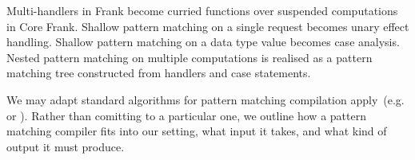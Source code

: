 \documentclass[preprint]{sigplanconf}
\newcommand{\many}{\overline}
\newcommand{\judgeword}[1]{~\mathbf{#1}~}
\newcommand{\sigentails}[1]{\mathbin{[{\text{\scriptsize ${#1}$}}]\!\text{-\!-}}\,}
\newcommand{\rt}[1]{\langle{#1}\rangle}   %
\newcommand{\makes}[4]  {#1 \sigentails{#2} {#3} \judgeword{is} {#4}}
\newcommand{\can}[4]{#1 \sigentails{#2} {#3} \judgeword{is} {#4}}
\newcommand{\does}[4]{#1 \sigentails{#2} {#3} \judgeword{has} {#4}}
\newcommand{\makesgs}{\makes{\Gamma}{\sigs}}
\newcommand{\doesgs}{\does{\Gamma}{\sigs}}
\newcommand{\sigs}{\Sigma}
\newcommand{\effbox}[1]{[#1]}
\newcommand{\key}[1]{\mathsf{#1}}
\newcommand{\handleSymbol}{\mathbin{?}}
\newcommand{\handle}[2]{{#1} \handleSymbol {#2}}
\newcommand{\thunk}[1]{\{{#1}\}}
\begin{document}



Multi-handlers in Frank become curried functions over suspended
computations in Core Frank.
%
Shallow pattern matching on a single request becomes unary effect
handling. Shallow pattern matching on a data type value becomes case
analysis. Nested pattern matching on multiple computations is realised
as a pattern matching tree constructed from handlers and case
statements. 

We may adapt standard algorithms for pattern matching compilation
apply~(e.g. \cite{Augustsson85} or \cite{Maranget08}). Rather than
comitting to a particular one, we outline how a pattern matching
compiler fits into our setting, what input it takes, and what kind of
output it must produce.
\end{document}
